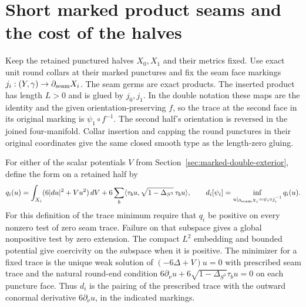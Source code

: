 \section{Short marked product seams and the cost of the halves}
\label{sec:short-marked-seam}

Keep the retained punctured halves \(X_0,X_1\) and their metrics
fixed. Use exact unit round collars at their marked punctures and
fix the seam face markings \(j_i:(Y,\gamma)\to\partial_{\rm seam}X_i\).
The seam germs are exact products. The inserted product has length
\(L>0\) and is glued by \(j_0,j_1\). In the double notation these
maps are the identity and the given orientation-preserving \(f\),
so the trace at the second face in its original marking is
\(\psi_1\circ f^{-1}\). The second half's orientation is reversed
in the joined four-manifold. Collar insertion and capping the
round punctures in their original coordinates give the same
closed smooth type as the length-zero gluing.

For either of the scalar potentials \(V\) from
Section~\ref{sec:marked-double-exterior}, define the form on a
retained half by
\[
 q_i(u)=\int_{X_i}(6|du|^2+Vu^2)\,dV
 +6\sum_b\langle\tau_bu,\sqrt{1-\Delta_{S^3}}\,\tau_bu\rangle,
 \qquad
 d_i[\psi_i]=\inf_{u|_{\partial_{\rm seam}X_i}
                         =\psi_i\circ j_i^{-1}}q_i(u).
\]
For this definition of the trace minimum require that \(q_i\)
be positive on every nonzero test of zero seam trace. Failure
on that subspace gives a global nonpositive test by zero
extension. The compact \(L^2\) embedding and bounded potential
give coercivity on the subspace when it is positive.
The minimizer for a fixed trace is the unique weak solution
of \((-6\Delta+V)u=0\) with prescribed seam trace and
the natural round-end condition
\(6\partial_\nu u+6\sqrt{1-\Delta_{S^3}}\tau_bu=0\) on each
puncture face. Thus \(d_i\) is the pairing of the prescribed
trace with the outward conormal derivative \(6\partial_\nu u\),
in the indicated markings.

